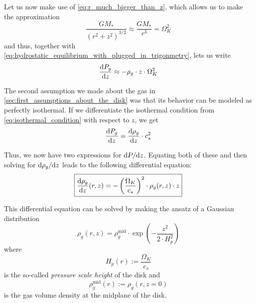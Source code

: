         Let us now make use of \cref{eq:r_much_bigger_than_z}, which allows us to make 
        the approximation
        \begin{equation}
            \frac{GM_*}{(r^2+z^2)^{3/2}} \approx \frac{GM_*}{r^3} = \Omega_K^2
        \end{equation}
        and thus, together with \cref{eq:hydrostatic_equilibrium_with_plugged_in_trigonmetry},
        lets us write
        \begin{equation}
            \frac{\text{d} P_g}{\text{d} z} \approx -\rho_g \cdot z \cdot \Omega_K^2
        \end{equation}

        

        The second assumption we made about the gas in \cref{sec:first_assumptions_about_the_disk}
        was that its behavior can be modeled as perfectly isothermal. If we differentiate the 
        isothermal condition from 
        \cref{eq:isothermal_condition} with respect to $z$, we get
        \begin{equation}
            \frac{\text{d} P_g}{\text{d} z} = \frac{\text{d} \rho_g}{\text{d} z}\cdot c_s^2
        \end{equation}

        Thus, we now have two expressions for $\text dP/\text dz$. Equating both of these and then 
        solving for $\text d\rho_g/\text dz$ leads to the following differential equation:
        \begin{equation}
            \boxed{
                \frac{\text{d} \rho_g}{\text{d} z}(r,z) 
                = -\left(\frac{\Omega_K}{c_s}\right)^2 \cdot \rho_g(r,z) \cdot z
            }
        \end{equation}

        This differential equation can be solved by making the ansatz of a Gaussian distribution
        \begin{equation}
            \boxed{
                \rho_g(r,z) = \rho_g^\text{mid}\cdot\exp\left(-\frac{z^2}{2\cdot H_p^2}\right)
            }
        \end{equation}
        where
        \begin{equation}
            H_p(r) :=\frac{\Omega_K}{c_s}
        \end{equation}
        is the so-called \textit{pressure scale height} of the disk
        and
        \begin{equation}
            \rho_g^\text{mid}(r) := \rho_g(r,z=0)
        \end{equation}
        is the gas volume density at the midplane of the disk. \\

